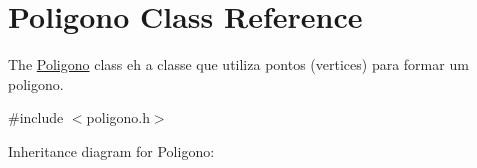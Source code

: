 \hypertarget{classPoligono}{}\section{Poligono Class Reference}
\label{classPoligono}


The \hyperlink{classPoligono}{Poligono} class eh a classe que utiliza pontos (vertices) para formar um poligono.  




{\ttfamily \#include $<$poligono.\+h$>$}



Inheritance diagram for Poligono\+:
